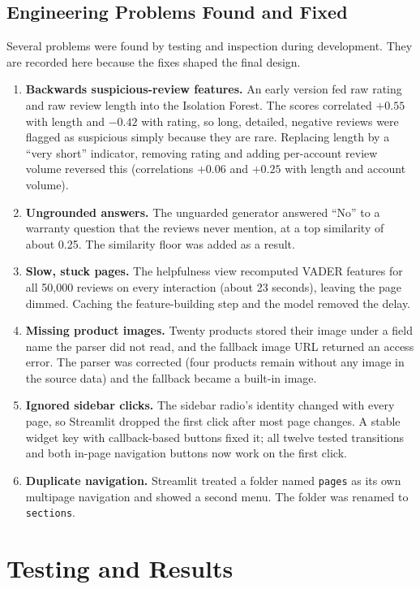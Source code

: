 \documentclass[12pt,a4paper]{report}
\begin{document}
\section{Engineering Problems Found and Fixed}
Several problems were found by testing and inspection during development. They are recorded here because the fixes shaped the final design.
\begin{enumerate}
\item \textbf{Backwards suspicious-review features.} An early version fed raw rating and raw review length into the Isolation Forest. The scores correlated $+0.55$ with length and $-0.42$ with rating, so long, detailed, negative reviews were flagged as suspicious simply because they are rare. Replacing length by a ``very short'' indicator, removing rating and adding per-account review volume reversed this (correlations $+0.06$ and $+0.25$ with length and account volume).
\item \textbf{Ungrounded answers.} The unguarded generator answered ``No'' to a warranty question that the reviews never mention, at a top similarity of about 0.25. The similarity floor was added as a result.
\item \textbf{Slow, stuck pages.} The helpfulness view recomputed VADER features for all 50,000 reviews on every interaction (about 23 seconds), leaving the page dimmed. Caching the feature-building step and the model removed the delay.
\item \textbf{Missing product images.} Twenty products stored their image under a field name the parser did not read, and the fallback image URL returned an access error. The parser was corrected (four products remain without any image in the source data) and the fallback became a built-in image.
\item \textbf{Ignored sidebar clicks.} The sidebar radio's identity changed with every page, so Streamlit dropped the first click after most page changes. A stable widget key with callback-based buttons fixed it; all twelve tested transitions and both in-page navigation buttons now work on the first click.
\item \textbf{Duplicate navigation.} Streamlit treated a folder named \texttt{pages} as its own multipage navigation and showed a second menu. The folder was renamed to \texttt{sections}.
\end{enumerate}

\chapter{Testing and Results}
\end{document}
